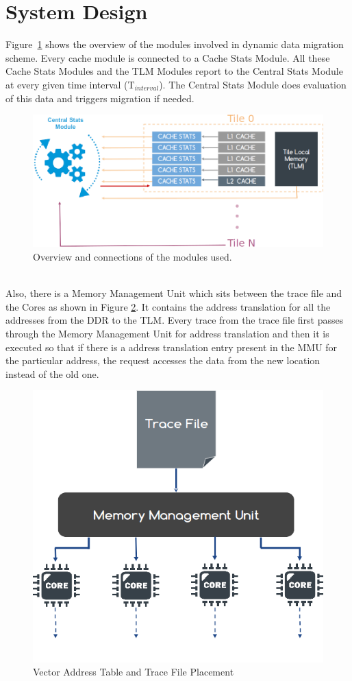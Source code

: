 \documentclass{listhesis}
\begin{document}
\section{System Design}
Figure~\ref{fig:overviewOfSolution} shows the overview of the modules involved in dynamic data migration scheme. Every cache module is connected to a Cache Stats Module. All these Cache Stats Modules and the TLM Modules report to the Central Stats Module at every given time interval (T$_{interval}$). The Central Stats Module does evaluation of this data and triggers migration if needed. \\
\begin{figure}
  \includegraphics[width=\linewidth]{moduleconnections.png}
  \centering
  \caption{Overview and connections of the modules used.}
  \label{fig:overviewOfSolution}
\end{figure}
\\
Also, there is a Memory Management Unit which sits between the trace file and the Cores as shown in Figure \ref{fig:traceFile}. It contains the address translation for all the addresses from the DDR to the TLM. Every trace from the trace file first passes through the Memory Management Unit for address translation and then it is executed so that if there is a address translation entry present in the MMU for the particular address, the request accesses the data from the new location instead of the old one.\\ 
\begin{figure}[h!]
  \includegraphics[width=0.7\linewidth]{traceFile.png}
  \centering
  \caption{Vector Address Table and Trace File Placement}
  \label{fig:traceFile}
\end{figure}
\end{document}
